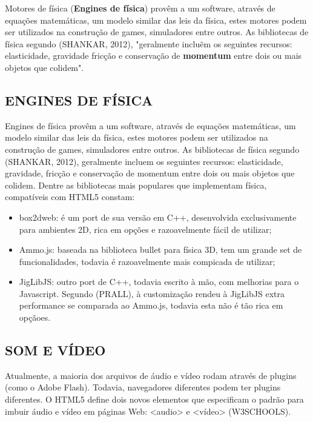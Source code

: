 \documentclass{article}
\begin{document}
Motores de física (\textbf{Engines de física}) provêm a um software, através de equações matemáticas, um modelo similar das leis da física, estes motores podem ser utilizados na construção de games, simuladores entre outros. As bibliotecas de física segundo (SHANKAR, 2012), "geralmente incluẽm os seguintes recursos: elasticidade, gravidade fricção e conservação de \textbf{momentum} entre dois ou mais objetos que colidem".


\subsection{ENGINES DE FÍSICA} 

Engines de física  provêm a um software, através de equações matemáticas, um modelo similar das leis da física, estes motores podem ser utilizados na construção de games, simuladores entre outros. As bibliotecas de física segundo (SHANKAR, 2012), geralmente incluem os seguintes recursos: elasticidade, gravidade, fricção e conservação de momentum entre dois ou mais objetos que colidem. 
	Dentre as bibliotecas mais populares que implementam física, compatíveis com HTML5 constam: 

\begin{itemize}
    \item box2dweb: é um port de sua versão em C++, desenvolvida exclusivamente para ambientes 2D, rica em opções e razoavelmente fácil de utilizar;
    \item Ammo.js: baseada na biblioteca bullet para física 3D, tem um grande set de funcionalidades, todavia é razoavelmente mais compicada de utilizar;

    \item JigLibJS: outro port de C++, todavia escrito à mão, com melhorias para o Javascript.  Segundo (PRALL), à customização rendeu à JigLibJS extra performance se comparada ao Ammo.js, todavia esta não é tão rica em opçãoes. 
\end{itemize}


\subsection{SOM E VÍDEO}

Atualmente, a maioria dos arquivos de áudio e vídeo rodam através de plugins (como o Adobe Flash). Todavia, navegadores diferentes podem ter plugins diferentes. O HTML5 define dois novos elementos que especificam o padrão para imbuir áudio e vídeo em páginas Web: <audio> e <vídeo> (W3SCHOOLS).  
\end{document}
